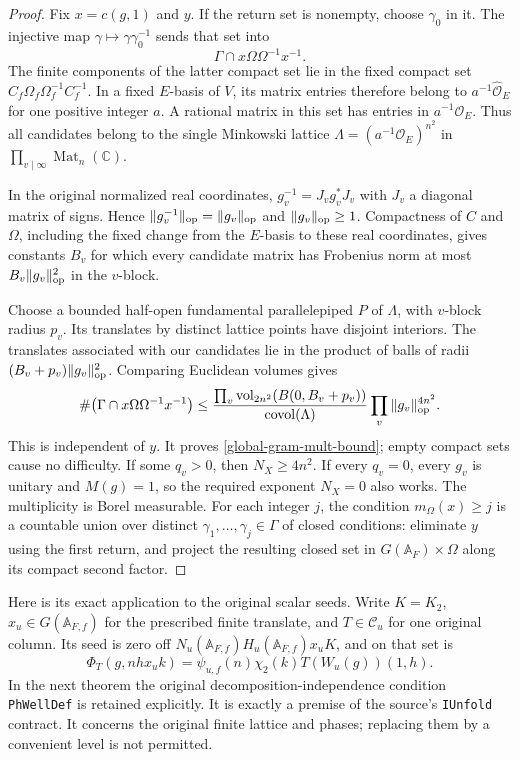\begin{proof}
Fix $x=c(g,1)$ and $y$.  If the return set is nonempty, choose
$\gamma_0$ in it.  The injective map $\gamma\mapsto\gamma\gamma_0^{-1}$
sends that set into
\[
 \Gamma\cap x\Omega\Omega^{-1}x^{-1}.
\]
The finite components of the latter compact set lie in the fixed
compact set $C_f\Omega_f\Omega_f^{-1}C_f^{-1}$.  In a fixed
$E$-basis of $V$, its matrix entries therefore belong to
$a^{-1}\widehat{\mathcal O}_E$ for one positive integer $a$.
A rational matrix in this set has entries in $a^{-1}\mathcal O_E$.
Thus all candidates belong to the single Minkowski lattice
$\Lambda=(a^{-1}\mathcal O_E)^{n^2}$ in
$\prod_{v\mid\infty}\operatorname{Mat}_n(\mathbb C)$.

In the original normalized real coordinates, $g_v^{-1}=J_vg_v^*J_v$
with $J_v$ a diagonal matrix of signs.  Hence
$\|g_v^{-1}\|_{\rm op}=\|g_v\|_{\rm op}$ and
$\|g_v\|_{\rm op}\ge1$.  Compactness of $C$ and $\Omega$, including
the fixed change from the $E$-basis to these real coordinates, gives
constants $B_v$ for which every candidate matrix has Frobenius norm
at most $B_v\|g_v\|_{\rm op}^2$ in the $v$-block.

Choose a bounded half-open fundamental parallelepiped $P$ of
$\Lambda$, with $v$-block radius $p_v$.  Its translates by distinct
lattice points have disjoint interiors.  The translates associated
with our candidates lie in the product of balls of radii
$(B_v+p_v)\|g_v\|_{\rm op}^2$.  Comparing Euclidean volumes gives
\[
 \#\bigl(\Gamma\cap x\Omega\Omega^{-1}x^{-1}\bigr)
 \le \frac{\prod_v\operatorname{vol}_{2n^2}(B(0,B_v+p_v))}
                {\operatorname{covol}(\Lambda)}
       \prod_v\|g_v\|_{\rm op}^{4n^2}.
\]
This is independent of $y$.  It proves \eqref{global-gram-mult-bound};
empty compact sets cause no difficulty.  If some $q_v>0$, then
$N_X\ge4n^2$.  If every $q_v=0$, every $g_v$ is unitary and
$M(g)=1$, so the required exponent $N_X=0$ also works.
The multiplicity is Borel measurable.  For each integer $j$, the
condition $m_\Omega(x)\ge j$ is a countable union over distinct
$\gamma_1,\ldots,\gamma_j\in\Gamma$ of closed conditions: eliminate
$y$ using the first return, and project the resulting closed set
in $G(\mathbb A_F)\times\Omega$ along its compact second factor.
\end{proof}

Here is its exact application to the original scalar seeds.  Write
$K=K_2$, $x_u\in G(\mathbb A_{F,f})$ for the prescribed finite translate,
and $T\in\mathcal C_u$ for one original column.  Its seed is zero
off $N_u(\mathbb A_{F,f})H_u(\mathbb A_{F,f})x_uK$, and on that set is
\begin{equation}\label{global-gram-original-seed}
 \Phi_T(g,nhx_uk)=\psi_{u,f}(n)\chi_2(k)
                       T(W_u(g))(1,h).
\end{equation}
In the next theorem the original decomposition-independence condition
\texttt{PhWellDef} is retained explicitly.  It is exactly a premise
of the source's \texttt{IUnfold} contract.  It concerns the original
finite lattice and phases; replacing them by a convenient level is
not permitted.

